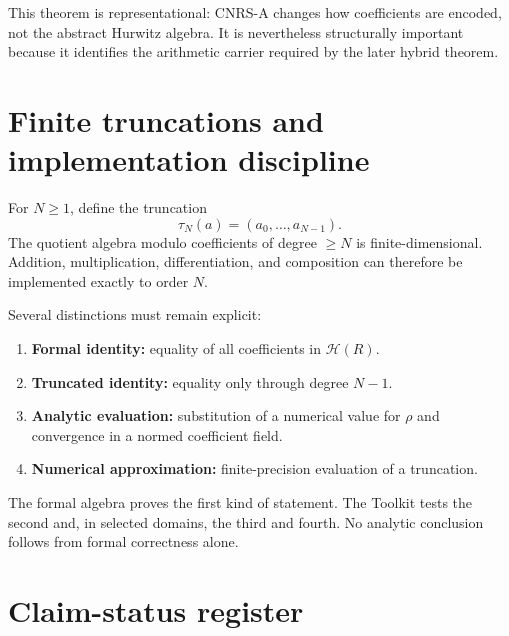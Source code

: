 \documentclass[11pt]{article}
\newcommand{\Hurs}{\mathcal H}
\begin{document}
This theorem is representational: CNRS-A changes how coefficients are encoded, not the abstract Hurwitz algebra.  It is nevertheless structurally important because it identifies the arithmetic carrier required by the later hybrid theorem.

\section{Finite truncations and implementation discipline}

For $N\ge1$, define the truncation
\[
\tau_N(a)=(a_0,\ldots,a_{N-1}).
\]
The quotient algebra modulo coefficients of degree $\ge N$ is finite-dimensional.  Addition, multiplication, differentiation, and composition can therefore be implemented exactly to order $N$.

Several distinctions must remain explicit:
\begin{enumerate}
\item \textbf{Formal identity:} equality of all coefficients in $\Hurs(R)$.
\item \textbf{Truncated identity:} equality only through degree $N-1$.
\item \textbf{Analytic evaluation:} substitution of a numerical value for $\rho$ and convergence in a normed coefficient field.
\item \textbf{Numerical approximation:} finite-precision evaluation of a truncation.
\end{enumerate}

The formal algebra proves the first kind of statement.  The Toolkit tests the second and, in selected domains, the third and fourth.  No analytic conclusion follows from formal correctness alone.

\section{Claim-status register}
\end{document}
